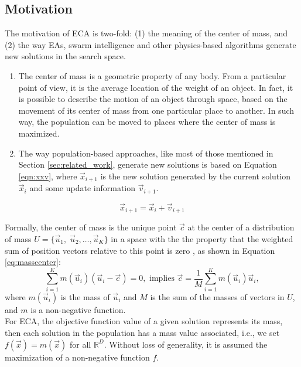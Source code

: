 \documentclass[12pt,letterpape]{article}
\begin{document}
\subsection{Motivation} %
The motivation of ECA is two-fold: (1) the meaning of the center of mass, and (2) 
the way EAs, swarm intelligence and other physics-based algorithms generate new 
solutions in the search space. 
% 
\begin{enumerate}
	\item The center of mass is a geometric property of any body. From a particular 
		  point of view, it is the average location of the weight of an object. 
		  In fact, it is possible to describe the motion of an object through 
		  space, based on the movement of its center of mass from one particular 
		  place to another. In such way, the population can be moved to places 
		  where the center of mass is maximized. 
	\item The way population-based approaches, like most of those mentioned in 
		  Section \ref{sec:related_work}, generate new solutions is based on 
		  Equation \ref{eqn:xxv}, where $\vec{x}_{i + 1}$ is the new solution 
		  generated by the current solution $\vec{x}_{i}$ and some update 
		  information $\vec{v}_{i + 1}$. 
\end{enumerate}
\begin{equation}
	\vec{x}_{i + 1} = \vec{x}_{i} + \vec{v}_{i + 1}
	\label{eqn:xxv}
\end{equation}
% 

Formally, the center of mass is the unique point $\vec{c}$ at the center of a 
distribution of mass $U = \{\vec{u}_1,\; \vec{u}_2 , \ldots , \vec{u}_K \}$ in a 
space with the the property that the weighted sum of position vectors relative 
to this point is zero \cite{kleppner73,serway}, as shown in Equation \ref{eq:masscenter}:
%
%
\begin{equation}
	\sum_{i = 1}^K m(\vec{u}_i) (\vec{u}_i - \vec{c}) = 0, \text{ implies } 
	\vec{c} = \dfrac{1}{M} \sum_{i = 1}^K  m(\vec{u}_i)  \vec{u}_i,
	\label{eq:masscenter}
\end{equation}
%
%
where $m(\vec{u}_i)$ is the mass of $\vec{u}_i$ and  $M$ is the sum of the 
masses of vectors in $U$, and $m$ is a non-negative function.\\


For ECA, the objective function value of a given solution represents
its mass, then each solution in the population has a mass value associated,  i.e., 
we set $f(\vec{x}) = m(\vec{x})$ for all $\mathbb{R}^D$. Without loss of generality, 
it is assumed the maximization of a non-negative function $f$.
\end{document}
